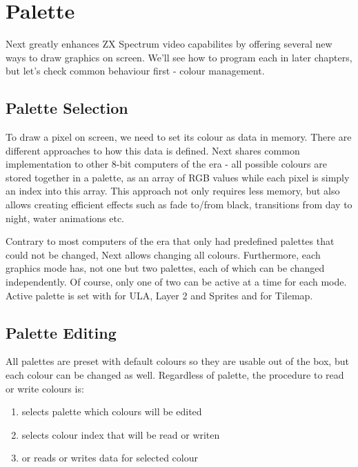 \section{Palette}
\label{zx_next_palette}

Next greatly enhances ZX Spectrum video capabilites by offering several new ways to draw graphics on screen. We'll see how to program each in later chapters, but let's check common behaviour first - colour management.

\subsection{Palette Selection}

To draw a pixel on screen, we need to set its colour as data in memory. There are different approaches to how this data is defined. Next shares common implementation to other 8-bit computers of the era - all possible colours are stored together in a palette, as an array of RGB values while each pixel is simply an index into this array. This approach not only requires less memory, but also allows creating efficient effects such as fade to/from black, transitions from day to night, water animations etc.

Contrary to most computers of the era that only had predefined palettes that could not be changed, Next allows changing all colours. Furthermore, each graphics mode has, not one but two palettes, each of which can be changed independently. Of course, only one of two can be active at a time for each mode. Active palette is set with  for ULA, Layer 2 and Sprites and  for Tilemap.

\subsection{Palette Editing}

All palettes are preset with default colours so they are usable out of the box, but each colour can be changed as well. Regardless of palette, the procedure to read or write colours is:

\begin{enumerate}[topsep=1pt,itemsep=1pt]
	\item {} selects palette which colours will be edited
	\item {} selects colour index that will be read or writen
	\item {} or  reads or writes data for selected colour
\end{enumerate}

